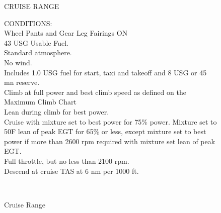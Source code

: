 \begin{figure}[t]
\begin{center}
\begin{perfhdr}CRUISE RANGE\\
\end{perfhdr}

\begin{minipage}{5in}
  \begin{flushleft}
    CONDITIONS:\\
    Wheel Pants and Gear Leg Fairings ON\\
    43 USG Usable Fuel.\\
    Standard atmosphere.\\
    No wind.\\
    Includes 1.0 USG fuel for start, taxi and takeoff and 8 USG or 45 mn reserve.\\
    Climb at full power and best climb speed as defined on the Maximum Climb Chart\\
    Lean during climb for best power.\\
    Cruise with mixture set to best power for 75\% power.  Mixture set to 50\textdegree F lean of peak EGT for 65\% or less, except mixture set to best power if more than 2600 rpm required with mixture set lean of peak EGT.\\
    Full throttle, but no less than 2100 rpm.\\
    Descend at cruise TAS at 6 nm per 1000 ft.\\
    \end{flushleft}
\end{minipage}\\
\vspace{5ex}
\end{center}  %
\caption{Cruise Range}
\label{Cruise-range}
\end{figure}
\clearpage



